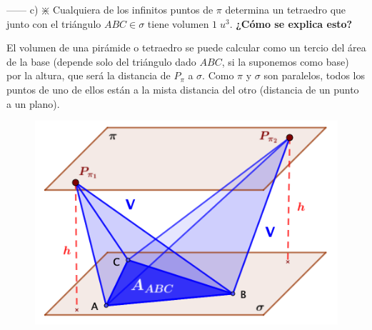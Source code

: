 \begin{proofw}
\noindent ------ c) $\divideontimes$ Cualquiera de los infinitos puntos de $\pi$ determina un tetraedro que junto con el triángulo $ABC \in \sigma$  tiene volumen $1 \; u^3$. \textbf{¿Cómo se explica esto?}

\begin{multicols}{2}
\noindent El volumen de una pirámide o tetraedro se puede calcular como un tercio del área de la base (depende solo del triángulo dado $ABC$, si la suponemos como base) por la altura, que será la distancia de $P_{\pi}$ a $\sigma$. Como $\pi$ y $\sigma$ son paralelos, todos los puntos de uno de ellos están a la mista distancia del otro (distancia de un punto a un plano).

	\begin{figure}[H]
		\centering
		\includegraphics[width=.6\textwidth]{imagenes/imagenes11/T11IM31.png}
	\end{figure}
\end{multicols}	

\end{proofw}


